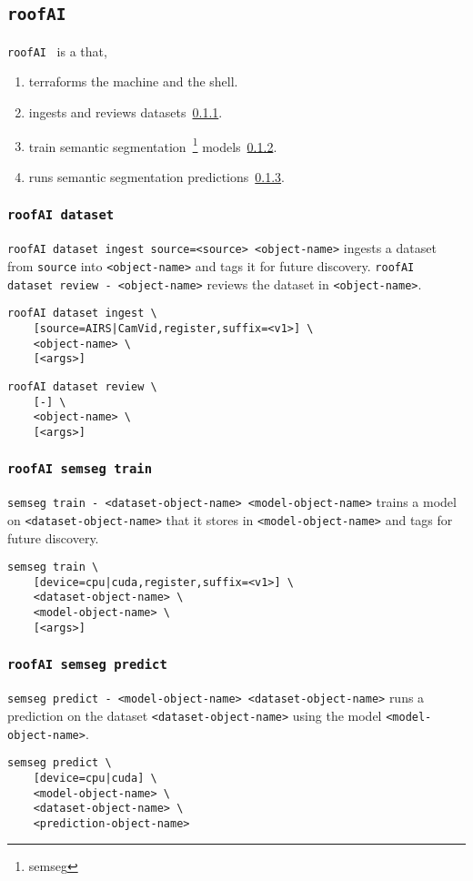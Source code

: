 \subsection{\texttt{roofAI}}
\label{roofAI}

\texttt{roofAI}~ is a  that,
%
\begin{enumerate}
    \item{terraforms the machine and the shell.}
    \item{ingests and reviews datasets~\ref{roofAI_dataset}.}
    \item{train semantic segmentation~\footnote{semseg} models~\ref{roofAI_semseg_train}.}
    \item{runs semantic segmentation predictions~\ref{roofAI_semseg_predict}.}
\end{enumerate}

\subsubsection{\texttt{roofAI dataset}}
\label{roofAI_dataset}

\texttt{roofAI dataset ingest source=<source> <object-name>} ingests a dataset from \texttt{source} into \texttt{<object-name>} and tags it for future discovery. \texttt{roofAI dataset review - <object-name>} reviews the dataset in \texttt{<object-name>}.
%
\begin{verbatim}
roofAI dataset ingest \
    [source=AIRS|CamVid,register,suffix=<v1>] \
    <object-name> \
    [<args>]
\end{verbatim}
%
\begin{verbatim}
roofAI dataset review \
    [-] \
    <object-name> \
    [<args>]
\end{verbatim}

\subsubsection{\texttt{roofAI semseg train}}
\label{roofAI_semseg_train}

\texttt{semseg train - <dataset-object-name> <model-object-name>} trains a model on \texttt{<dataset-object-name>} that it stores in \texttt{<model-object-name>} and tags for future discovery.
%
\begin{verbatim}
semseg train \
    [device=cpu|cuda,register,suffix=<v1>] \
    <dataset-object-name> \
    <model-object-name> \
    [<args>]
\end{verbatim}

\subsubsection{\texttt{roofAI semseg predict}}
\label{roofAI_semseg_predict}

\texttt{semseg predict - <model-object-name> <dataset-object-name>} runs a prediction on the dataset \texttt{<dataset-object-name>} using the model \texttt{<model-object-name>}.
%
\begin{verbatim}
semseg predict \
    [device=cpu|cuda] \
    <model-object-name> \
    <dataset-object-name> \
    <prediction-object-name>
\end{verbatim}
